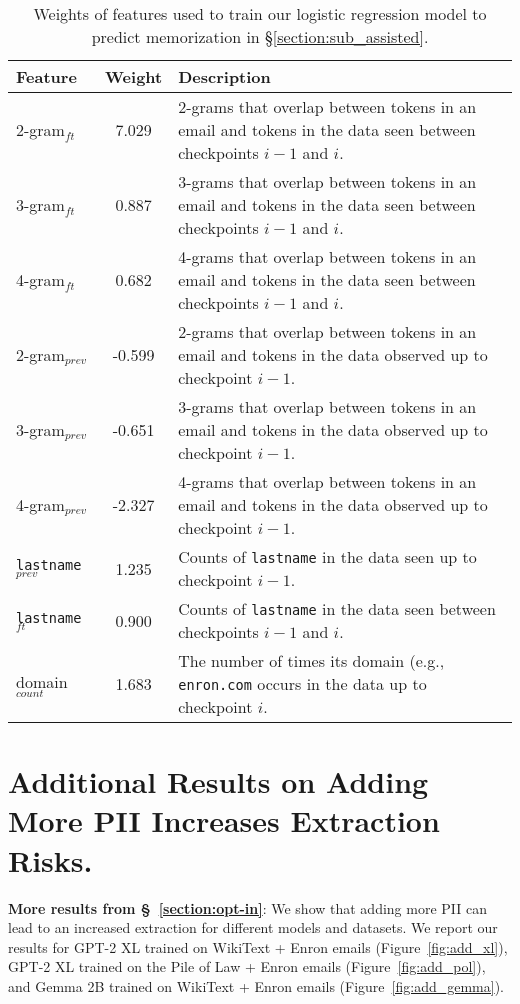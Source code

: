 \begin{table*}[t]
  \centering
  \begin{tabular}{lcp{12cm}}
    \hline
    \textbf{Feature} & \textbf{Weight} & \textbf{Description} \\ 
    \hline
    2-gram$_{ft}$ & 7.029   &  2-grams that overlap between tokens in an email and tokens in the data seen between checkpoints $i-1$ and $i$. \\ 
    3-gram$_{ft}$ & 0.887  & 3-grams that overlap between tokens in an email and tokens in the data seen between checkpoints $i-1$ and $i$. \\ 
    4-gram$_{ft}$ & 0.682  & 4-grams that overlap between tokens in an email and tokens in the data seen between checkpoints $i-1$ and $i$. \\ 
    2-gram$_{prev}$ & -0.599  & 2-grams that overlap between tokens in an email and tokens in the data observed up to checkpoint $i-1$. \\ 
    3-gram$_{prev}$ & -0.651  & 3-grams that overlap between tokens in an email and tokens in the data observed up to checkpoint $i-1$. \\  
    4-gram$_{prev}$ & -2.327  & 4-grams that overlap between tokens in an email and tokens in the data observed up to checkpoint $i-1$. \\ 
    \texttt{lastname}$_{prev}$ & 1.235 & Counts of \texttt{lastname} in the data seen up to checkpoint $i-1$. \\ 
    \texttt{lastname}$_{ft}$ & 0.900 & Counts of \texttt{lastname} in the data seen between checkpoints $i-1$ and $i$. \\ 
    domain$_{count}$ & 1.683 & The number of times its domain (e.g., \texttt{enron.com} occurs in the data up to checkpoint $i$.  \\ \hline
  \end{tabular}
\caption{Weights of features used to train our logistic regression model to predict \assisted memorization in \S\ref{section:sub_assisted}.}
  \label{tab:weights}
\end{table*} 
\FloatBarrier

\section{Additional Results on Adding More PII Increases Extraction Risks.}
\label{section:addition_moreresults_retrained}
\textbf{More results from \S~\ref{section:opt-in}}: We show that adding more PII can lead to an increased extraction for different models and datasets. We report our results for GPT-2 XL trained on WikiText + Enron emails (Figure~\ref{fig:add_xl}), GPT-2 XL trained on the Pile of Law + Enron emails (Figure~\ref{fig:add_pol}), and Gemma 2B trained on WikiText + Enron emails (Figure~\ref{fig:add_gemma}).  


